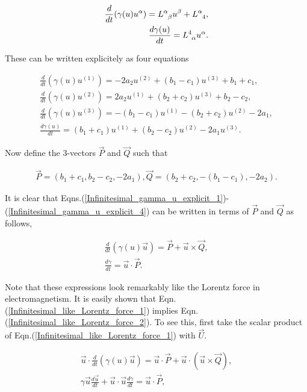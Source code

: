 \begin{eqnarray*} 
\frac{d}{dt} (\gamma(u) u^{\alpha}) = \tensor{L}{^{\alpha}_{\beta}} u^{\beta} + \tensor{L}{^{\alpha}_{4}}, \\
\frac{d\gamma(u)}{dt} = \tensor{L}{^{4}_{\alpha}} u^{\alpha}.
\end{eqnarray*} 

\noindent These can be written explicitely as four equations

\begin{eqnarray}\label{Infinitesimal_gamma_u_explicit_1}
\frac{d}{dt} (\gamma(u) u^{(1)}) = -2a_2u^{(2)} + (b_1 - c_1)u^{(3)} + b_1 + c_1, \\ \label{Infinitesimal_gamma_u_explicit_2}
\frac{d}{dt} (\gamma(u) u^{(2)}) = 2a_2 u^{(1)} + (b_2 + c_2) u^{(3)} + b_2 - c_2,\\ \label{Infinitesimal_gamma_u_explicit_3}
\frac{d}{dt} (\gamma(u) u^{(3)}) = -(b_1 - c_1) u^{(1)} - (b_2 + c_2 )u^{(2)} - 2a_1,\\ \label{Infinitesimal_gamma_u_explicit_4}
\frac{d\gamma(u)}{dt} = (b_1 + c_1)u^{(1)} + (b_2 - c_2) u^{(2)} - 2a_1 u^{(3)}.
\end{eqnarray}

Now define the $3$-vectors $\vec{P}$ and $\vec{Q}$ such that

\begin{eqnarray*}
\vec{P} = (b_1+c_1,b_2-c_2,-2a_1),
\vec{Q} = (b_2 + c_2, -(b_1 - c_1),-2a_2).
\end{eqnarray*}

It is clear that Eqns.(\ref{Infinitesimal_gamma_u_explicit_1})-(\ref{Infinitesimal_gamma_u_explicit_4}) can be written in terms of $\vec{P}$ and $\vec{Q}$ as follows,

\begin{eqnarray}\label{Infinitesimal_like_Lorentz_force_1}
\frac{d}{dt} (\gamma(u)\vec{u}) = \vec{P} + \vec{u} \times \vec{Q}, \\ \label{Infinitesimal_like_Lorentz_force_2}
\frac{d\gamma}{dt} = \vec{u} \cdot \vec{P}.
\end{eqnarray}

\noindent Note that these expressions look remarkably like the Lorentz force in electromagnetism. It is easily shown that Eqn.(\ref{Infinitesimal_like_Lorentz_force_1}) implies Eqn.(\ref{Infinitesimal_like_Lorentz_force_2}). To see this, first take the scalar product of Eqn.(\ref{Infinitesimal_like_Lorentz_force_1}) with $\vec{U}$.

\begin{eqnarray}\label{Infinitesimal_1_imples_2_calc_1}
\vec{u} \cdot \frac{d}{dt} (\gamma(u)\vec{u}) = \vec{u} \cdot \vec{P} + \vec{u} \cdot (\vec{u} \times \vec{Q}), \\ \label{Infinitesimal_1_imples_2_calc_2}
\gamma \vec{u} \frac{d\vec{u}}{dt} + \vec{u} \cdot \vec{u} \frac{d\gamma}{dt} = \vec{u} \cdot \vec{P},
\end{eqnarray}

